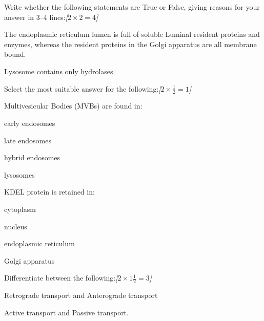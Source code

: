 \documentclass[11pt,a4paper]{article}
\newcommand{\pts}[1]{\hfill   \textit{[#1]}}
\begin{document}
\begin{parts}
  \item Write whether the following statements are True or False, giving reasons for your answer in 3--4 lines:\pts{$2  \times 2 = 4$}
  
\begin{parts}
    \item The endoplasmic reticulum lumen is full of soluble Luminal resident proteins and enzymes, whereas the resident proteins in the Golgi apparatus are all membrane bound.
    \item Lysosome contains only hydrolases.
  \end{parts}

  \item Select the most suitable answer for the following:\pts{$2  \times \frac{1}{2} = 1$}
  
\begin{parts}
    \item Multivesicular Bodies (MVBs) are found in:
    
\begin{parts}
      \item early endosomes
      \item late endosomes
      \item hybrid endosomes
      \item lysosomes
    \end{parts}

    \item KDEL protein is retained in:
    
\begin{parts}
      \item cytoplasm
      \item nucleus
      \item endoplasmic reticulum
      \item Golgi apparatus
    \end{parts}
  \end{parts}

  \item Differentiate between the following:\pts{$2  \times 1\frac{1}{2} = 3$}
  
\begin{parts}
    \item Retrograde transport and Anterograde transport
    \item Active transport and Passive transport.
  \end{parts}
\end{parts}
\end{document}
